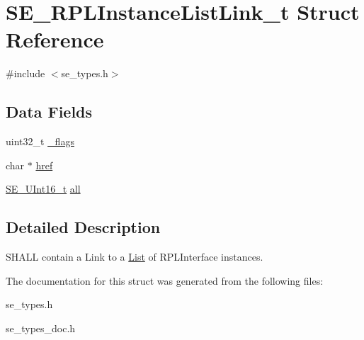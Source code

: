 \hypertarget{structSE__RPLInstanceListLink__t}{}\section{S\+E\+\_\+\+R\+P\+L\+Instance\+List\+Link\+\_\+t Struct Reference}
\label{structSE__RPLInstanceListLink__t}


{\ttfamily \#include $<$se\+\_\+types.\+h$>$}

\subsection*{Data Fields}
\begin{DoxyCompactItemize}
\item 
uint32\+\_\+t \hyperlink{group__RPLInstanceListLink_ga6d6d1023c9902e004cc289f39d2d1b6b}{\+\_\+flags}
\item 
char $\ast$ \hyperlink{group__RPLInstanceListLink_gaa34aa0bfadddbf5475945072be5facbf}{href}
\item 
\hyperlink{group__UInt16_gac68d541f189538bfd30cfaa712d20d29}{S\+E\+\_\+\+U\+Int16\+\_\+t} \hyperlink{group__RPLInstanceListLink_ga7001fa025c0862ff52e99fcd509fe6c0}{all}
\end{DoxyCompactItemize}


\subsection{Detailed Description}
S\+H\+A\+LL contain a Link to a \hyperlink{structList}{List} of R\+P\+L\+Interface instances. 

The documentation for this struct was generated from the following files\+:\begin{DoxyCompactItemize}
\item 
se\+\_\+types.\+h\item 
se\+\_\+types\+\_\+doc.\+h\end{DoxyCompactItemize}
